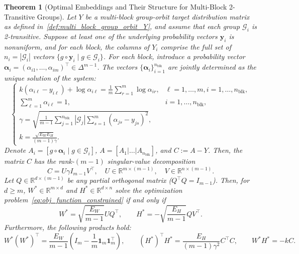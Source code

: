 \documentclass[11pt]{article}
\newtheorem{theorem}{Theorem}
\begin{document}
\begin{theorem}[Optimal Embeddings and Their Structure for Multi-Block 2-Transitive Groups]
\label{thm:2_transitive_multiblock}
Let \( Y \) be a multi-block group-orbit target distribution matrix as defined in~\cref{def:multi_block_group_orbit_Y}, and assume that each group \( \mathcal G_i \) is 2-transitive.
Suppose at least one of the underlying probability vectors \(\boldsymbol{y}_i\) is nonuniform, and for each block, the columns of \(Y_i\) comprise the full set of \(n_i = |\mathcal G_i|\) vectors \(\{g \circ \boldsymbol{y}_i \mid g \in \mathcal G_i\}\).
For each block, introduce a probability vector $\boldsymbol{\alpha}_i=(\alpha_{i1},\dots,\alpha_{im})^{\top}\in\Delta^{m-1}$.
The vectors $\{\boldsymbol{\alpha}_i\}_{i=1}^{n_{\mathrm{blk}}}$ are jointly determined
as the unique solution of the system:
\begin{equation}
\label{eq:alpha_system_2trans}
  \begin{cases}
    \displaystyle k\left(\alpha_{i\ell}-y_{i\ell}\right)
      +\log\alpha_{i\ell}
     =\displaystyle\frac1m\sum_{r=1}^{m}\log\alpha_{ir},
    &  \ell=1,\dots,m,   i=1,\dots,n_{\mathrm{blk}},\\[1em]
    \displaystyle\sum_{\ell=1}^{m}\alpha_{i\ell}=1,
    &  i=1,\dots,n_{\mathrm{blk}},\\[1em]
    \displaystyle \gamma = \sqrt{\frac{1}{m-1}\sum_{j=1}^{n_{\mathrm{blk}}}|\mathcal G_j|\sum_{s=1}^m (\alpha_{js}-y_{js})^2}, \\[1em]
    \displaystyle k = \frac{\sqrt{E_W E_H}}{(m-1)\gamma}.
  \end{cases}
\end{equation}
Denote \(A_i=[g \circ \boldsymbol{\alpha}_i\mid g\in \mathcal G_i]\), \(A=[A_1|\dots|A_{n_{\mathrm{blk}}}]\), and \(C:=A-Y\).
Then, the matrix $C$ has the rank-$(m-1)$ singular-value decomposition
\[
  C
  =U \gamma I_{m-1} V^{\top},
  \quad
  U\in\mathbb{R}^{m\times(m-1)}, \quad
  V\in\mathbb{R}^{n\times(m-1)}.
\]
Let $Q\in\mathbb{R}^{d\times(m-1)}$ be any partial orthogonal matrix
($Q^{\top}Q=I_{m-1}$).
Then, for \(d \ge m\),  $W^* \in \mathbb{R}^{m \times d}$ and $H^* \in \mathbb{R}^{d \times n}$ solve the optimization problem~\cref{eq:obj_function_constrained} if and only if
\[
  W^*=\sqrt{\frac{E_W}{m-1}} UQ^{\top},
  \qquad
  H^*=-\sqrt{\frac{E_H}{m-1}} QV^{\top}.
\]
Furthermore, the following products hold:
\begin{equation}\label{eq:opt_products_2trans}
  W^*(W^*)^{\top}
    =\frac{E_W}{m-1}
        \left(I_{m}-\frac1m \boldsymbol1_{m}\boldsymbol1_{m}^{\top}\right),\qquad
  (H^*)^{\top}H^*
    =\frac{E_H}{(m-1)\gamma^{2}} C^{\top}C,\qquad
  W^*H^* =-k C.
\end{equation}
\end{theorem}
\end{document}
